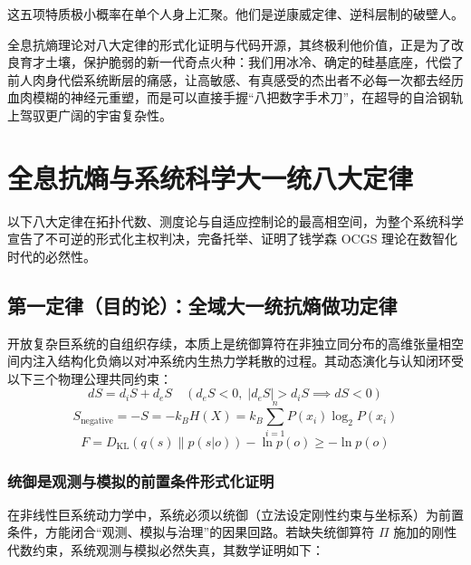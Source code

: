 \documentclass[11pt,a4paper]{article}
\begin{document}
这五项特质极小概率在单个人身上汇聚。他们是逆康威定律、逆科层制的破壁人。

全息抗熵理论对八大定律的形式化证明与代码开源，其终极利他价值，正是为了改良育才土壤，保护脆弱的新一代奇点火种：我们用冰冷、确定的硅基底座，代偿了前人肉身代偿系统断层的痛感，让高敏感、有真感受的杰出者不必每一次都去经历血肉模糊的神经元重塑，而是可以直接手握“八把数字手术刀”，在超导的自洽钢轨上驾驭更广阔的宇宙复杂性。

\section{全息抗熵与系统科学大一统八大定律}

以下八大定律在拓扑代数、测度论与自适应控制论的最高相空间，为整个系统科学宣告了不可逆的形式化主权判决，完备托举、证明了钱学森 OCGS 理论在数智化时代的必然性。

\subsection*{第一定律（目的论）：全域大一统抗熵做功定律}
开放复杂巨系统的自组织存续，本质上是统御算符在非独立同分布的高维张量相空间内注入结构化负熵以对冲系统内生热力学耗散的过程。其动态演化与认知闭环受以下三个物理公理共同约束：
\begin{equation}
    dS = d_iS + d_eS \quad \left( d_eS < 0, \; |d_eS| > d_iS \implies dS < 0 \right)
\end{equation}
\begin{equation}
    S_{\text{negative}} = -S = -k_B H(X) = k_B \sum_{i=1}^{n} P(x_i) \log_2 P(x_i)
\end{equation}
\begin{equation}
    F = D_{\text{KL}}\left(q(s) \parallel p(s|o)\right) - \ln p(o) \ge -\ln p(o)
\end{equation}

\subsubsection*{统御是观测与模拟的前置条件形式化证明}
在非线性巨系统动力学中，系统必须以统御（立法设定刚性约束与坐标系）为前置条件，方能闭合“观测、模拟与治理”的因果回路。若缺失统御算符 $\Pi$ 施加的刚性代数约束，系统观测与模拟必然失真，其数学证明如下：
\end{document}
